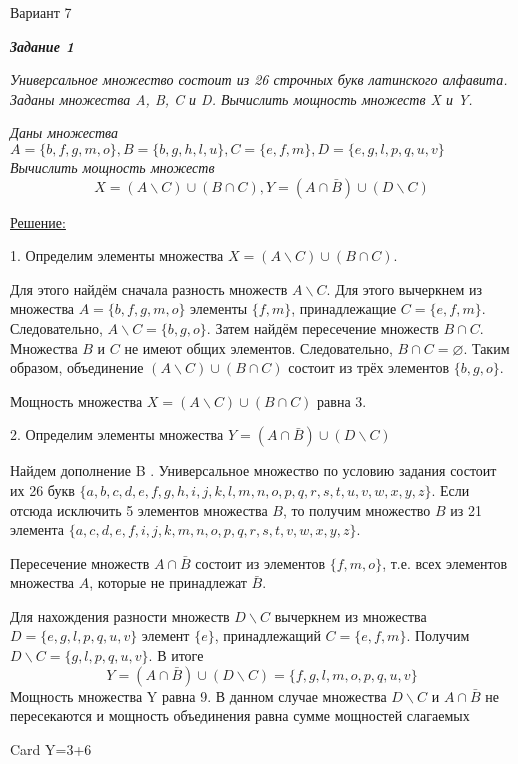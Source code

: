 \documentclass[11pt]{article}
\let\emptyset\varnothing
\begin{document}
	\begin{center}
	Вариант 7
	\end{center}
	
	\textit{\textbf{Задание 1}}

	\textit{Универсальное множество состоит из 26 строчных букв латинского
алфавита. Заданы множества A, B, C и D. Вычислить мощность множеств X
и Y.}

\textit{Даны множества
$A=\{b,f,g,m,o\}, B=\{b,g,h,l,u\}, C=\{e,f,m\}, D=\{e,g,l,p,q,u,v\}$\\
Вычислить мощность множеств}
$$X = (A \backslash C) \cup (B \cap C),
Y=(A \cap \bar B) \cup (D \backslash C) $$

\underline{Решение:}

1. Определим элементы множества 
$X = (A \backslash C) \cup (B \cap C)$.

Для этого найдём сначала разность множеств $A \backslash C$.
Для этого вычеркнем из множества $A=\{b,f,g,m,o\}$ элементы
$\{f, m\}$, принадлежащие $C=\{e,f,m\}$. Следовательно,
$A \backslash C = \{b, g, o\}$.
Затем найдём пересечение множеств $B \cap C$.
Множества $B$ и $C$ не имеют общих элементов. Следовательно,
$B \cap C = \emptyset$.
Таким образом, объединение $(A \backslash C) \cup (B \cap C)$ состоит из
трёх элементов $\{b, g, o\}$.

Мощность множества 
$X = (A \backslash C) \cup (B \cap C)$ равна 3.

2. Определим элементы множества 
$Y=(A \cap \bar B) \cup (D \backslash C)$

Найдем дополнение B . Универсальное множество по условию задания
состоит их 26 букв
$\{a,b,c,d,e,f,g,h,i,j,k,l,m,n,o,p,q,r,s,t,u,v,w,x,y,z\}$.
Если отсюда исключить 5 элементов множества $B$, то получим множество
$B$ из 21 элемента
$\{a,c,d,e,f,i,j,k,m,n,o,p,q,r,s,t,v,w,x,y,z\}$.

Пересечение множеств $A \cap \bar B$
состоит из элементов $\{f, m, o\}$, т.е. всех
элементов множества $A$, которые не принадлежат $\bar B$.

Для нахождения разности множеств $D \backslash C$ вычеркнем из множества
$D=\{e,g,l,p,q,u,v\}$
элемент $\{e\}$, принадлежащий
$C=\{e,f,m\}$. Получим
$D \backslash C = \{g, l, p, q, u, v\}$. В итоге\\
$$Y=(A \cap \bar B) \cup (D \backslash C) = \{f,g,l,m,o,p,q,u,v\}$$
Мощность множества Y равна 9. В данном случае множества $D \backslash C$
и $A \cap \bar B$ не пересекаются и мощность объединения равна
сумме мощностей слагаемых

Card Y=3+6
\end{document}
